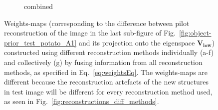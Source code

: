 \documentclass[journal]{IEEEtran}
\begin{document}
\begin{figure}[!h]
\begin{subfigure}[b]{0.24\linewidth}
        \caption{combined}
     \end{subfigure}
      \caption{Weights-maps (corresponding to the difference between pilot reconstruction of the image in the last sub-figure of Fig.~\ref{fig:object-prior_test_potato_A1} and its projection onto the eigenspace $\boldsymbol{V_\text{low}}$) constructed using different reconstruction methods individually (a-f) and collectively (g) by fusing information from all reconstruction methods, as specified in Eq.~\ref{eq:weightsEq}. The weights-maps are different because the reconstruction artefacts of the new structures in test image will be different for every reconstruction method used, as seen in Fig.~\ref{fig:reconstructions_diff_methods}. }
\label{fig:weights_map_2Dpotato}
\end{figure}
\end{document}
